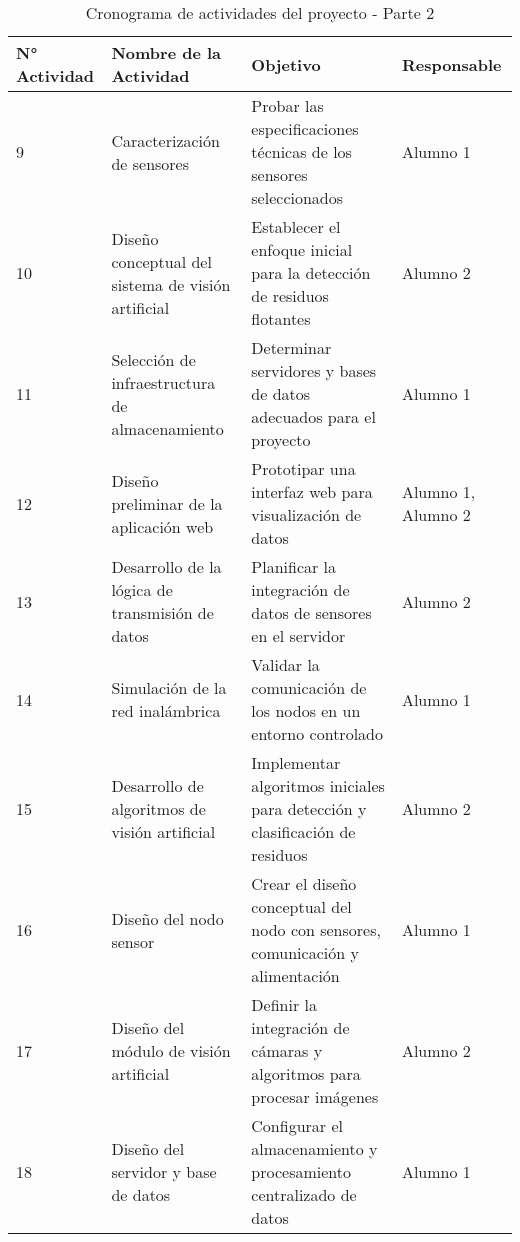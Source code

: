 \begin{table}[H]
    \centering
    \renewcommand{\arraystretch}{1.5}
    \begin{tabular}{ |p{1.5cm}|p{5cm}|p{5.5cm}|p{2.5cm}| }

        \hline
        \textbf{N° Actividad} & \textbf{Nombre de la Actividad} & \textbf{Objetivo} & \textbf{Responsable} \\
        \hline

       9 & Caracterización de sensores & Probar las especificaciones técnicas de los sensores seleccionados & Alumno 1 \\\hline
        10 & Diseño conceptual del sistema de visión artificial & Establecer el enfoque inicial para la detección de residuos flotantes & Alumno 2 \\\hline
        11 & Selección de infraestructura de almacenamiento & Determinar servidores y bases de datos adecuados para el proyecto & Alumno 1 \\\hline
        12 & Diseño preliminar de la aplicación web & Prototipar una interfaz web para visualización de datos & Alumno 1, Alumno 2 \\\hline
        13 & Desarrollo de la lógica de transmisión de datos & Planificar la integración de datos de sensores en el servidor & Alumno 2 \\\hline
        14 & Simulación de la red inalámbrica & Validar la comunicación de los nodos en un entorno controlado & Alumno 1 \\\hline
        15 & Desarrollo de algoritmos de visión artificial & Implementar algoritmos iniciales para detección y clasificación de residuos & Alumno 2 \\\hline
        16 & Diseño del nodo sensor & Crear el diseño conceptual del nodo con sensores, comunicación y alimentación & Alumno 1 \\\hline
        17 & Diseño del módulo de visión artificial & Definir la integración de cámaras y algoritmos para procesar imágenes & Alumno 2 \\\hline
        18 & Diseño del servidor y base de datos & Configurar el almacenamiento y procesamiento centralizado de datos & Alumno 1 \\\hline

    \end{tabular}
    \caption{Cronograma de actividades del proyecto - Parte 2}
    \label{tab:cronograma_proyecto_parte2}
\end{table}
